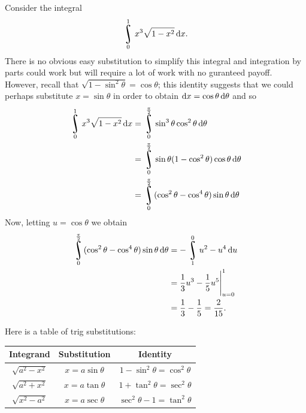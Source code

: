 


Consider the integral
\begin{displaymath}
  \rint^1_0 x^3 \sqrt{1-x^2} \dif{x}.
\end{displaymath}
There is no obvious easy substitution to simplify this integral and integration by parts could work but will require
a lot of work with no guranteed payoff. However, recall that $ \sqrt{1 - \sin^2 \theta} = \cos \theta $; this identity
suggests that we could perhaps substitute $ x = \sin \theta $ in order to obtain $ \dif{x} = \cos \theta \dif{\theta} $ and so
\begin{displaymath}
  \begin{aligned}
    \rint^1_0 x^3 \sqrt{1-x^2} \dif{x} &= \rint^{\frac{\pi}{2}}_0 \sin^3 \theta \cos^2 \theta \dif{\theta}\\
                                      &= \rint^{\frac{\pi}{2}}_0 \sin \theta (1-\cos^2 \theta)\cos \theta \dif{\theta}\\
                                      &= \rint^{\frac{\pi}{2}}_0 (\cos^2 \theta - \cos^4 \theta) \sin \theta \dif{\theta}
  \end{aligned}
\end{displaymath}
Now, letting $ u = \cos \theta $ we obtain
\begin{displaymath}
  \begin{aligned}
    \rint^{\frac{\pi}{2}}_0 (\cos^2 \theta - \cos^4 \theta) \sin \theta \dif{\theta} &= -\rint^{0}_{1} u^2 - u^4 \dif{u}\\
                                                                                    &= \eval{\frac{1}{3}u^3 - \frac{1}{5}u^5}_{u = 0}^{1}\\
                                                                                    &= \frac{1}{3}-\frac{1}{5} = \frac{2}{15}.
  \end{aligned}
\end{displaymath}

Here is a table of trig substitutions:

\begin{center}
  \def\arraystretch{1.5}
  \begin{tabular}{|c|c|c|}\hline
    \textbf{Integrand} & \textbf{Substitution} & \textbf{Identity}\\\hline
    $ \sqrt{a^2 - x^2} $ & $ x = a \sin \theta $ & $ 1 - \sin^2 \theta = \cos^2 \theta $\\\hline
    $ \sqrt{a^2 + x^2} $ & $ x = a \tan \theta $ & $ 1 + \tan^2 \theta = \sec^2 \theta $\\\hline
    $ \sqrt{x^2 - a^2} $ & $ x = a \sec \theta $ & $ \sec^2 \theta - 1 = \tan^2 \theta $\\\hline
  \end{tabular}
\end{center}


